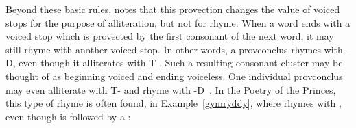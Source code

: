 Beyond these basic rules, \textcite{morris-jones_cerdd_1925} notes that this provection changes the value of voiced stops for the purpose of alliteration, but not for rhyme.
When a word ends with a voiced stop which is provected by the first consonant of the next word, it may still rhyme with another voiced stop.  In other words, a \gls{provconclus} rhymes with -\gls{D}, even though it alliterates with \gls{T}-. Such a resulting consonant cluster may be thought of as beginning voiced and ending voiceless. One individual \gls{provconclus} may even alliterate with \gls{T}- and rhyme with -\gls{D}~\autocite[\S 391]{morris-jones_cerdd_1925}. 
In the Poetry of the Princes, this type of rhyme is often found, \eg in Example~\ref{gymryddy}, where  rhymes with , even though  is followed by a :     

